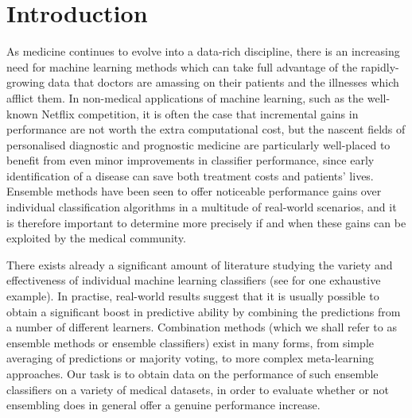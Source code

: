 \documentclass{bioinfo}
\begin{document}
\maketitle

\section{Introduction}

As medicine continues to evolve into a data-rich discipline, there is an increasing need for machine learning methods which can take full advantage of the rapidly-growing data that doctors are amassing on their patients and the illnesses which afflict them. In non-medical applications of machine learning, such as the well-known Netflix competition, it is often the case that incremental gains in performance are not worth the extra computational cost, but the nascent fields of personalised diagnostic and prognostic medicine are particularly well-placed to benefit from even minor improvements in classifier performance, since early identification of a disease can save both treatment costs and patients' lives. Ensemble methods have been seen to offer noticeable performance gains over individual classification algorithms in a multitude of real-world scenarios, and it is therefore important to determine more precisely if and when these gains can be exploited by the medical community.

There exists already a significant amount of literature studying the variety and effectiveness of individual machine learning classifiers (see \cite{classifiercomparison} for one exhaustive example). In practise, real-world results suggest that it is usually possible to obtain a significant boost in predictive ability by combining the predictions from a number of different learners. Combination methods (which we shall refer to as ensemble methods or ensemble classifiers) exist in many forms, from simple averaging of predictions or majority voting, to more complex meta-learning approaches. Our task is to obtain data on the performance of such ensemble classifiers on a variety of medical datasets, in order to evaluate whether or not ensembling does in general offer a genuine performance increase.
\end{document}
